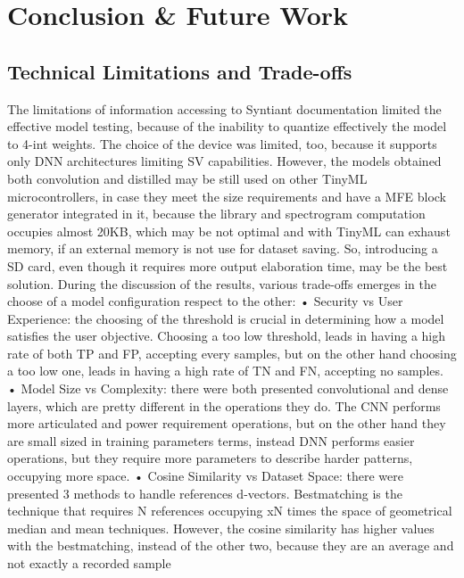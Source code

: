 \chapter{Conclusion \& Future Work}
\label{cha:conclusion}

\section{Technical Limitations and Trade-offs}
\label{sec:technical limits and trade-offs}
The limitations of information accessing to Syntiant documentation limited the effective model testing, because of the inability to quantize effectively the model to 4-int weights. The choice of the device was limited, too, because it supports only DNN architectures limiting SV capabilities. However, the models obtained both convolution and distilled may be still used on other TinyML microcontrollers, in case they meet the size requirements and have a MFE block generator integrated in it, because the library and spectrogram computation occupies almost 20KB, which may be not optimal and with TinyML can exhaust memory, if an external memory is not use for dataset saving. So, introducing a SD card, even though it requires more output elaboration time, may be the best solution.\newline
During the discussion of the results, various trade-offs emerges in the choose of a model configuration respect to the other:\newline
• Security vs User Experience: the choosing of the threshold is crucial in determining how a model satisfies the user objective. Choosing a too low threshold, leads in having a high rate of both TP and FP, accepting every samples, but on the other hand choosing a too low one, leads in having a high rate of TN and FN, accepting no samples.\newline 
• Model Size vs Complexity: there were both presented convolutional and dense layers, which are pretty different in the operations they do. The CNN performs more articulated and power requirement operations, but on the other hand they are small sized in training parameters terms, instead DNN performs easier operations, but they require more parameters to describe harder patterns, occupying more space.\newline
• Cosine Similarity vs Dataset Space: there were presented 3 methods to handle references d-vectors. Bestmatching is the technique that requires N references occupying xN times the space of geometrical median and mean techniques. However, the cosine similarity has higher values with the bestmatching, instead of the other two, because they are an average and not exactly a recorded sample\newline

